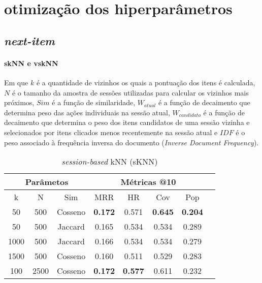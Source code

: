 \chapter{otimização dos hiperparâmetros}

\section{\textit{next-item}}
\subsubsection{skNN e vskNN}
Em que $k$ é a quantidade de vizinhos os quais a pontuação dos itens é
calculada, $N$ é o tamanho da amostra de sessões utilizadas para calcular os
vizinhos mais próximos, $Sim$ é a função de similaridade, $W_{atual}$ é a função
de decaimento que determina peso das ações individuais na sessão atual,
$W_{candidato}$ é a função de decaimento que determina o peso dos itens
candidatos de uma sessão vizinha e selecionados por itens clicados menos
recentemente na sessão atual e $IDF$ é o peso associado à frequência inversa do
documento (\textit{Inverse Document Frequency}).

\begin{table}[htbp]
    \centering
    \begin{tabular}{|c|c|c|c|c|c|c|c|}
      \hline
      \multicolumn{3}{|c|}{Parâmetos} & \multicolumn{4}{c|}{Métricas @10} \\
      \hline
      k & N & Sim & MRR & HR & Cov & Pop\\
      \hline
      50 & 500 & Cosseno & \textbf{0.172} & 0.571 & \textbf{0.645} & \textbf{0.204} \\
      \hline
      50 & 500 & Jaccard & 0.165 & 0.534 & 0.534 & 0.289 \\
      \hline
      1000 & 500 & Jaccard & 0.166 & 0.534 & 0.534 & 0.279 \\
      \hline
      1500 & 500 & Cosseno & 0.160 & 0.511 & 0.529 & 0.283 \\
      \hline
      100 & 2500 & Cosseno & \textbf{0.172} & \textbf{0.577} & 0.611 & 0.232 \\
      \hline
    \end{tabular}
    \caption{\textit{session-based} kNN (sKNN)}
  \end{table}



